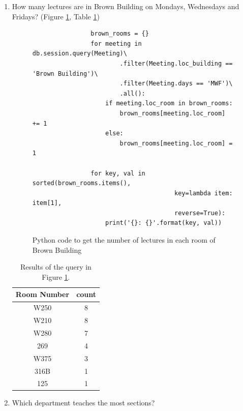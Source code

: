 \documentclass[12pt,letterpaper,titlepage]{article}
\begin{document}
\begin{enumerate}
    \item
        How many lectures are in Brown Building on Mondays, Wednesdays and
        Fridays? (Figure \ref{lst:lecinbrown}, Table \ref{tbl:lecinbrown})

        \begin{figure}[H]
            \centering
            \begin{verbatim}
                brown_rooms = {}
                for meeting in db.session.query(Meeting)\
                        .filter(Meeting.loc_building == 'Brown Building')\
                        .filter(Meeting.days == 'MWF')\
                        .all():
                    if meeting.loc_room in brown_rooms:
                        brown_rooms[meeting.loc_room] += 1
                    else:
                        brown_rooms[meeting.loc_room] = 1

                for key, val in sorted(brown_rooms.items(),
                                       key=lambda item: item[1],
                                       reverse=True):
                    print('{}: {}'.format(key, val))
            \end{verbatim}
            \caption{\label{lst:lecinbrown}Python code to get the
                     number of lectures in each room of Brown Building}
        \end{figure}
        
        \begin{table}[H]
            \centering
            \begin{tabular}{|c|c|}
                \hline
                Room Number & count \\
                \hline
                W250        &     8 \\
                W210        &     8 \\
                W280        &     7 \\
                269         &     4 \\
                W375        &     3 \\
                316B        &     1 \\
                125         &     1 \\
                \hline
            \end{tabular}
            \caption{\label{tbl:lecinbrown}Results of the query in Figure
                    \ref{lst:lecinbrown}.}
        \end{table}
    \item
        Which department teaches the most sections?


\end{enumerate}
\end{document}
